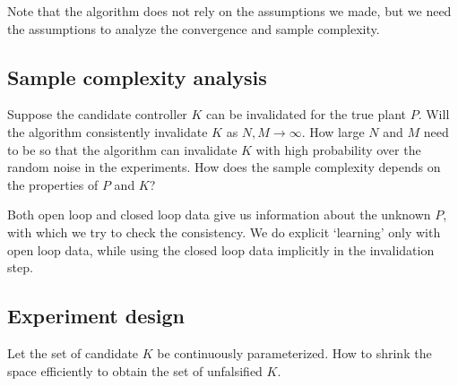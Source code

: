 \documentclass[11pt, onecolumn]{article}
\begin{document}
\begin{remark}
  Note that the algorithm does not rely on the assumptions we made, but we need the assumptions to
  analyze the convergence and sample complexity.
\end{remark}

\subsection{Sample complexity analysis}

Suppose the candidate controller $K$ can be invalidated for the true plant $P$.   Will
the algorithm consistently invalidate $K$ as $N,M\to\infty$.  How large $N$ and $M$ need to be so that the
algorithm can invalidate $K$ with high probability over the random noise in the experiments. How
does the sample complexity depends on the properties of $P$ and $K$?

Both open loop and closed loop data give us information about the unknown $P$, with which we try to
check the consistency.  We do explicit `learning' only with open loop data, while using the closed
loop data implicitly in the invalidation step.


\subsection{Experiment design}

Let the set of candidate $K$ be continuously parameterized. How to shrink the space efficiently to
obtain the set of unfalsified $K$.

\end{document}
